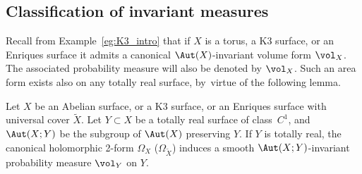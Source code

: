 \subsection{Classification of invariant measures}

Recall from Example~\ref{eg:K3_intro} that if $X$ is a torus, a K3 surface, or an Enriques surface it admits a canonical $\Aut(X)$-invariant volume form $\vol_X$. The associated probability measure will also be denoted by $\vol_X$. Such an area form exists also on any totally real surface, by~virtue of the following lemma.

\begin{lem}\label{lem:volume_Y}
Let $X$ be an Abelian surface, or a K3 surface, or an Enriques surface with universal cover $\tilde{X}$.
Let $Y\subset X$ be a totally real surface of class~$C^1$, and $\Aut(X;Y)$ be the
subgroup of $\Aut(X)$ preserving $Y$.
If $Y$ is totally real, the canonical holomorphic 2-form
$\Omega_X$ (\resp $\Omega_{\tilde{X}}$) induces a smooth $\Aut(X;Y)$-invariant probability
measure $\vol_Y$ on $Y$.
\end{lem}

